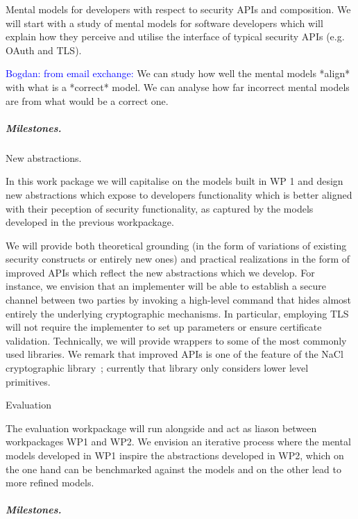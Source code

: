 \documentclass[10pt]{article}
\newcommand{\bw}[1]{{\textcolor{blue} {Bogdan: #1}}}
\begin{document}
\begin{description}\itemsep-3pt
\item[WP 1] Mental models for developers with respect to security APIs and composition. 
We will start with a study of mental models for software developers which will explain how they perceive and utilise the interface of typical security APIs (e.g. OAuth and TLS). 

\bw{from email exchange:}
We can study how well the mental models *align* with what is a *correct* model.   We can analyse how far incorrect mental models are from what would be a correct one. 

\subparagraph{Milestones.} 

\item[WP 2] New abstractions. 

In this work package we will capitalise on the models built in WP 1 and design new abstractions which expose to developers functionality which is better aligned with their peception of security functionality, as captured by the models developed in the previous workpackage. 

We will provide both theoretical grounding (in the form of variations of existing security constructs or entirely new ones) and practical realizations in the form of improved APIs which reflect the new abstractions which we develop.  For instance, we envision that an implementer will be able to establish a secure channel between two parties by invoking a high-level command that hides almost entirely the underlying cryptographic mechanisms.  
In particular, employing TLS will not require the implementer to set up parameters or ensure certificate validation.  
Technically, we will provide wrappers to some of the most commonly used libraries.  
We remark that improved APIs is one of the feature of the NaCl cryptographic library~\cite{bernstein}; currently that library only considers lower level primitives.  
\item[WP 3] Evaluation

The evaluation workpackage will run alongside and act as liason between workpackages WP1 and WP2.  
We envision an iterative process where the mental models developed in WP1 inspire the abstractions developed in WP2, which on the one hand can be benchmarked against the models and on the other lead to more refined models. 

\vspace{-\baselineskip}
\subparagraph{Milestones.}


\end{description}
\end{document}
